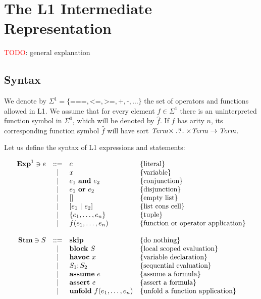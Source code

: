 \chapter{The L1 Intermediate Representation}
\label{cap:intermediateRepresentation}


\textcolor{red}{TODO}: general explanation

\section{Syntax}

We denote by $\Sigma^{1} = \{ \texttt{===}, \texttt{<=}, \texttt{>=}, 
\texttt{+}, \texttt{-}, \dots \}$ the set of operators and functions allowed 
in L1. We assume that for every element $f \in \Sigma^{1}$ there is an 
uninterpreted function symbol in $\Sigma^{0}$, which will be denoted by 
$\widehat{f}$. If $f$ has arity $n$, its corresponding function symbol 
$\widehat{f}$ will have sort $\mathit{Term} \times \stackrel{n}{\dots} 
\times \mathit{Term} \rightarrow \mathit{Term}$.

Let us define the syntax of L1 expressions and statements:

\[
\begin{array}{rcll}
\mathbf{Exp}^{1} \ni e & ::= & c & \{ \textrm{literal} \}\\
& | & x & \{ \textrm{variable} \}\\
& | & e_1~\textbf{and}~e_2 & \{ \textrm{conjunction} \}\\
& | & e_1~\textbf{or}~e_2 & \{ \textrm{disjunction} \}\\
& | & [] & \{ \textrm{empty list} \}\\
& | & [e_1~|~e_2] & \{ \textrm{list cons cell} \}\\
& | & \{e_1, \ldots, e_n\} & \{ \textrm{tuple} \}\\
& | & f(e_1, \ldots, e_n) & \{ \textrm{function or operator application} \}\\

\\
\mathbf{Stm} \ni S & ::= & \textbf{skip} & \{ \textrm{do nothing} \} \\
 & | & \textbf{block}~S & \{ \textrm{local scoped evaluation} \}\\
 & | & \textbf{havoc}~x & \{ \textrm{variable declaration} \}\\
 & | & S_1;S_2 & \{ \textrm{sequential evaluation} \}\\
 & | & \textbf{assume}~e & \{ \textrm{assume a formula} \}\\
 & | & \textbf{assert}~e & \{ \textrm{assert a formula} \}\\
 & | & \textbf{unfold}~f(e_1, \dots, e_n) & \{ \textrm{unfold a function application} \}\\
\end{array}
\]

